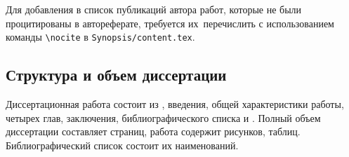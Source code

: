 Для добавления в список публикаций автора работ, которые не были процитированы в
автореферате, требуется их~перечислить с использованием команды \verb!\nocite! в
\verb!Synopsis/content.tex!.

\subsection*{Структура и объем диссертации}


Диссертационная работа состоит из , введения, общей характеристики работы, четырех глав, заключения, библиографического списка и . Полный объем диссертации составляет  страниц, работа содержит  рисунков,  таблиц. Библиографический список состоит их  наименований.










